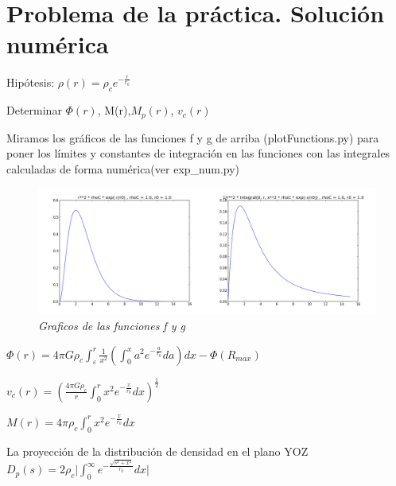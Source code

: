 \documentclass[12pt]{book}
\begin{document}
\section*{Problema de la práctica. Solución numérica}
\begin{description}
\item Hipótesis: $\rho(r) = \rho_c e^{-\frac{r}{r_0}} $
\item Determinar $\Phi(r)$, M(r),$M_p(r)$, $v_c(r)$ 

\end{description}


\begin{description}
\item Miramos los gráficos de las funciones f y g de arriba (plotFunctions.py) para poner los límites y constantes de integración en las funciones con las integrales calculadas de forma numérica(ver exp\_num.py)
\begin{figure}[!ht]
 \centering
 \includegraphics[scale=0.33]{func12Plot.png}
 \caption{\emph{Graficos de las funciones f y g}}
\end{figure}

\item $\Phi(r) = 4 \pi G \rho_c \int_\varepsilon^r{ \frac{1}{x^2}(\int_0^x{a^2 e^{-\frac{a}{r_0}}da})dx} -\Phi(R_{max})$
\item $v_c(r) = (\frac{4 \pi G \rho_c}{r}\int_0^r{x^2 e^{-\frac{x}{r_0}}dx} )^{\frac{1}{2}}  $ 
\item $M(r) = 4 \pi \rho_c \int_0^r{x^2 e^{-\frac{x}{r_0}}dx}$ 
\item La proyección de la distribución de densidad en el plano YOZ
$D_p(s) = 2 \rho_c \lvert \int_0^\infty{e^{-\frac{\sqrt{s^2 + x^2}}{r_0}} dx}  \rvert$


\end{description}
\end{document}
